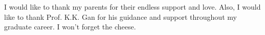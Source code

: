 \begin{acknowledgements}
I would like to thank my parents for their endless support and love. Also, I would like to thank Prof. K.K. Gan for his guidance and support throughout my graduate career. I won't forget the cheese.
\end{acknowledgements}

